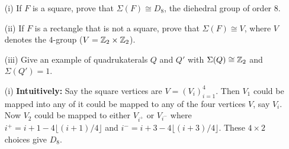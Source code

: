 \begin{myenumerate}

\item
\begin{excopy}
\begin{itemize}
 \item[(i)]
   If $F$ is a square, prove that \(\Sigma(F)\cong D_8\),
   the diehedral group of order $8$.
 \item[(ii)]
   If $F$ is a rectangle that is not a square, prove that
   \(\Sigma(F)\cong V\), where $V$ denotes
   the $4$-group (\(V=\mathbb{Z}_2\times\mathbb{Z}_2\)).
 \item[(iii)]
   Give an example of quadrukaterals $Q$ and $Q'$ with
   \(\Sigma(Q)\cong \mathbb{Z}_2\) and \(\Sigma(Q')=1\).
\end{itemize}
\end{excopy}

\begin{itemize}
 \item[(i)]
   \textbf{Intuitively:}
   Say the square vertices are \(V=(V_i)_{i=1}^4\).
   Then \(V_1\) could be mapped into any of  it could be mapped to
   any of the four vertices $V$, say \(V_i\).
   Now \(V_2\) could be mapped to either
   \(V_{i^{+}}\) or \(V_{i^{-}}\) where
   \(i^{+} = i + 1 - 4\lfloor(i+1)/4\rfloor\) and
   \(i^{-} = i + 3 - 4\lfloor(i+3)/4\rfloor\).
   These \(4\times 2\) choices give \(D_8\).


\end{itemize}
\end{myenumerate}
